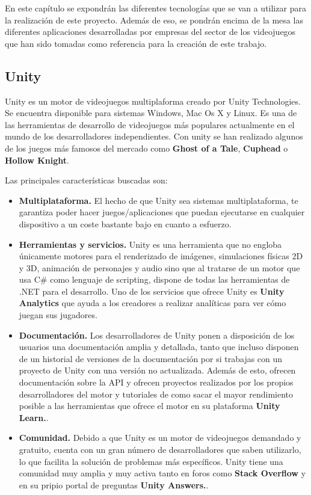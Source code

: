 En este cap\'itulo se expondr\'an las diferentes tecnolog\'ias que se van a utilizar para la realizaci\'on de este proyecto. Adem\'as de eso, se pondr\'an encima de la mesa las diferentes aplicaciones desarrolladas por empresas del sector de los videojuegos que han sido tomadas como referencia para la creaci\'on de este trabajo. 
\subsection{Unity}
\label{cap2:subsec:unity}

Unity es un motor de videojuegos multiplaforma creado por Unity Technologies. Se encuentra disponible para sistemas Windows, Mac Os X y Linux. Es una de las herramientas de desarrollo de videojuegos m\'as populares actualmente en el mundo de los desarrolladores independientes. Con unity se han realizado algunos de los juegos m\'as famosos del mercado como \textbf{Ghost of a Tale}, \textbf{Cuphead} o  \textbf{Hollow Knight}.

Las principales caracter\'isticas buscadas son:

\begin{itemize}
\item \textbf{Multiplataforma.} El hecho de que Unity sea sistemas multiplataforma, te garantiza poder hacer juegos/aplicaciones que puedan ejecutarse en cualquier dispositivo a un coste bastante bajo en cuanto a esfuerzo.

\item  \textbf{Herramientas y servicios.} Unity es una herramienta que no engloba \'unicamente motores para el renderizado de im\'agenes, simulaciones f\'isicas 2D y 3D, animaci\'on de personajes y audio sino que al tratarse de un motor que usa C\#  como lenguaje de scripting, dispone de todas las herramientas de .NET para el desarrollo. Uno de los servicios que ofrece Unity es \textbf{Unity Analytics} que ayuda a los creadores a realizar anal\'iticas para ver c\'omo juegan sus jugadores.

\item  \textbf{Documentaci\'on.} Los desarrolladores de Unity ponen a disposici\'on de los usuarios una documentaci\'on amplia y detallada, tanto que incluso disponen de un historial de versiones de la documentaci\'on por si trabajas con un proyecto de Unity con una versi\'on no actualizada. Adem\'as de esto, ofrecen documentaci\'on sobre la API y ofrecen proyectos realizados por los propios desarrolladores del motor y tutoriales de como sacar el mayor rendimiento posible a las herramientas que ofrece el motor en su plataforma \textbf{Unity Learn.}.

\item  \textbf{Comunidad.} Debido a que Unity es un motor de videojuegos demandado y gratuito, cuenta con un gran n\'umero de desarrolladores que saben utilizarlo, lo que facilita la soluci\'on de problemas m\'as espec\'ificos. Unity tiene una comunidad muy amplia y muy activa tanto en foros como \textbf{Stack Overflow} y en su pripio portal de preguntas \textbf{Unity Answers.}.
\end{itemize}

